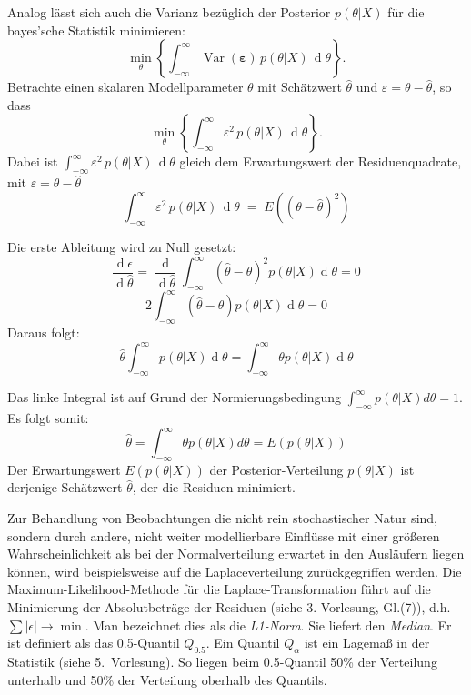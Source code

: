Analog lässt sich auch die Varianz bezüglich der Posterior $p(\theta|X)$ für die bayes'sche Statistik minimieren:
\begin{equation}
\min_{\theta} \left\{ \int_{-\infty}^{\infty} \operatorname{Var}(\boldsymbol \varepsilon)  \, p(\theta|X) \, \operatorname d \theta \right\} .
\end{equation}
Betrachte einen skalaren Modellparameter $\theta$ mit Schätzwert $\hat \theta$ und $\varepsilon = \theta - \hat \theta$, so dass
\begin{equation}
\min_{\theta} \left\{ \int_{-\infty}^{\infty} \varepsilon^2  \, p(\theta|X) \, \operatorname d \theta \right\} .
\end{equation}
Dabei ist $\int_{-\infty}^{\infty} \varepsilon^2  \, p(\theta|X) \, \operatorname d \theta$ gleich dem Erwartungswert der 
Residuenquadrate, mit $\varepsilon = \theta - \hat \theta$
$$
\int_{-\infty}^{\infty} \varepsilon^2  \, p(\theta|X) \, \operatorname d \theta \;
= \; E( (\theta - \hat \theta)^2 )
$$

Die erste Ableitung wird zu Null gesetzt:
\begin{equation}  
\frac{\operatorname d \epsilon}{\operatorname d \hat\theta } = \frac{\operatorname d}{\operatorname d \hat\theta } \int_{-\infty}^{\infty}
(\hat\theta - \theta)^2 p(\theta|X) \operatorname d\theta = 0 
\end{equation}
\[
2 \int_{-\infty}^{\infty} (\hat\theta - \theta) p(\theta|X) \operatorname d\theta = 0
\]
Daraus folgt: 
\[
\hat\theta \int_{-\infty}^{\infty} p(\theta|X) \operatorname d\theta = \int_{-\infty}^{\infty} \theta p(\theta|X) \operatorname d \theta
\]

Das linke Integral ist auf Grund der Normierungsbedingung $\int_{-\infty}^{\infty} p(\theta|X) d\theta = 1$. Es folgt somit: 
\begin{equation}
\hat\theta = \int_{-\infty}^{\infty} \theta p(\theta|X) d \theta = E(p(\theta|X))
\end{equation}
Der Erwartungswert $E(p(\theta|X))$ der Posterior-Verteilung $p(\theta|X)$ ist derjenige Schätzwert
$\hat{\theta}$, der die Residuen minimiert. 


Zur Behandlung von Beobachtungen die nicht rein stochastischer Natur sind, sondern durch andere, nicht weiter
modellierbare Einflüsse mit einer größeren Wahrscheinlichkeit als bei der Normalverteilung erwartet in den
Ausläufern liegen können, wird beispielsweise auf die Laplaceverteilung zurückgegriffen werden. Die Maximum-Likelihood-Methode für die Laplace-Transformation führt auf die Minimierung der Absolutbeträge der Residuen (siehe 3. Vorlesung, Gl.(7)),
d.h. $\sum \left|\epsilon \right| \rightarrow \min$. Man bezeichnet dies
als die \textit{L1-Norm}. Sie liefert den \textit{Median}. Er ist 
definiert als das 0.5-Quantil $Q_{0.5}$. Ein Quantil $Q_\alpha$ ist ein Lagemaß in der Statistik (siehe 5.~Vorlesung). So liegen beim 0.5-Quantil 50\% der Verteilung unterhalb und 50\% der Verteilung oberhalb des Quantils.

